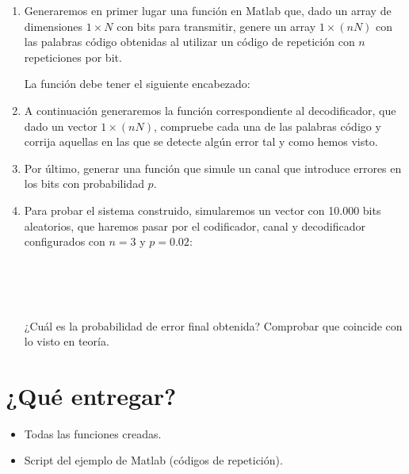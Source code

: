 \documentclass[es,practica,12pt]{uah}
\begin{document}
	\begin{enumerate}
	\item \textrm{Generaremos en primer lugar una función en Matlab que, dado un array de dimensiones $1 \times N$ con bits para transmitir, genere un array $1 \times (n N)$ con las palabras código obtenidas al utilizar un código de repetición con $n$ repeticiones por bit.}

		\textrm{La función debe tener el siguiente encabezado:}
		

	\item \textrm{A continuación generaremos la función correspondiente al decodificador, que dado un vector $1 \times (n N)$, compruebe cada una de las palabras código y corrija aquellas en las que se detecte algún error tal y como hemos visto.}
	

	\item \textrm{Por último, generar una función que simule un canal que introduce errores en los bits con probabilidad $p$.} 
	
			
	\item \textrm{Para probar el sistema construido, simularemos un vector con 10.000 bits aleatorios, que haremos pasar por el codificador, canal y decodificador configurados con $n=3$ y $p=0.02$:}
	
 		\\
		\\
		\\
	
		\textrm{¿Cuál es la probabilidad de error final obtenida? Comprobar que coincide con lo visto en teoría. }
	
\end{enumerate}

\section{¿Qué entregar?}
\begin{itemize}
	\item Todas las funciones creadas.
	\item Script del ejemplo de Matlab (códigos de repetición).
\end{itemize}
\end{document}
